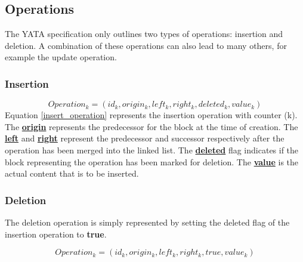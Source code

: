 \documentclass[12pt]{article}
\begin{document}
  \subsection{Operations}
  The YATA specification only outlines two types of operations: insertion and deletion.
  A combination of these operations can also lead to many others, for example the update operation.

  \subsubsection{Insertion}
  \begin{equation} \label{insert_operation}
    Operation_{k} = (id_{k}, origin_{k}, left_{k}, right_{k}, deleted_{k}, value_{k})
  \end{equation}
  Equation \ref{insert_operation} represents the insertion operation with counter (k).
  The \underline{\textbf{origin}} represents the predecessor for the block at the time of creation.
  The \underline{\textbf{left}} and \underline{\textbf{right}} represent the predecessor and successor respectively after the operation has been merged into the linked list.
  The \underline{\textbf{deleted}} flag indicates if the block representing the operation has been marked for deletion.
  The \underline{\textbf{value}} is the actual content that is to be inserted.
  
  \subsubsection{Deletion}
  The deletion operation is simply represented by setting the deleted flag of the insertion operation to \textbf{true}.
  
  \begin{equation} \label{deletion_operation}
    Operation_{k} = (id_{k}, origin_{k}, left_{k}, right_{k}, true, value_{k})
  \end{equation}
\end{document}
